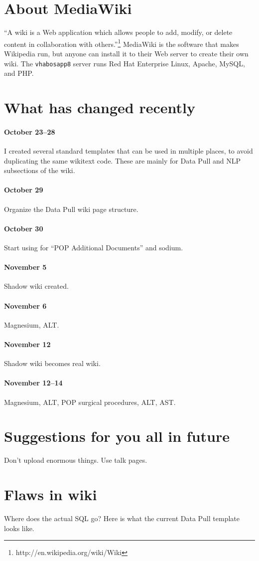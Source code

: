 \documentclass{tufte-handout}
\begin{document}
\section{About MediaWiki}

``A wiki is a Web application which allows people to add, modify, or
delete content in collaboration with
others.''\footnote{http://en.wikipedia.org/wiki/Wiki} MediaWiki is the
software that makes Wikipedia run, but anyone can install it to their
Web server to create their own wiki. The \texttt{vhabosapp8} server
runs Red Hat Enterprise Linux, Apache, MySQL, and PHP.

\section{What has changed recently}

\paragraph{October 23--28} I created several standard templates that
can be used in multiple places, to avoid duplicating the same wikitext
code. These are mainly for Data Pull and NLP subsections of the wiki. 

\paragraph{October 29} Organize the Data Pull wiki page structure. 

\paragraph{October 30} Start using for ``POP Additional Documents''
and sodium.

\paragraph{November 5} Shadow wiki created.

\paragraph{November 6} Magnesium, ALT.

\paragraph{November 12} Shadow wiki becomes real wiki.

\paragraph{November 12--14} Magnesium, ALT, POP surgical procedures,
ALT, AST.

\section{Suggestions for you all in future}

Don't upload enormous things. Use talk pages. 

\section{Flaws in wiki}

Where does the actual SQL go? Here is what the current Data Pull
template looks like.
\end{document}
